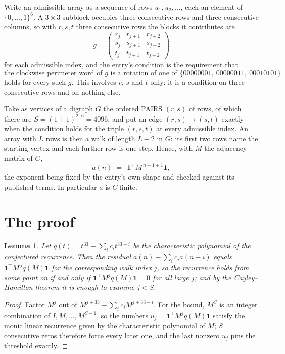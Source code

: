 \documentclass[11pt,a4paper]{article}
\theoremstyle{plain}
\newtheorem{lemma}[theorem]{Lemma}
\theoremstyle{definition}
\begin{document}
Write an admissible array as a sequence of rows $u_1,u_2,\dots$, each an element of
$\{0,\dots,1\}^{6}$. A $3\times3$ subblock occupies three consecutive rows and
three consecutive columns, so with $r,s,t$ three consecutive rows the blocks it
contributes are
\[
g=\begin{pmatrix}r_j&r_{j+1}&r_{j+2}\\ s_j&s_{j+1}&s_{j+2}\\ t_j&t_{j+1}&t_{j+2}\end{pmatrix}
\]
for each admissible index, and the entry's condition is the requirement that
\[
\text{the clockwise perimeter word of }g\text{ is a rotation of one of }\{00000001,\ 00000011,\ 00010101\}
\]
holds for every such $g$. This involves $r$, $s$ and $t$ only: it is a condition on
three consecutive rows and on nothing else.

Take as vertices of a digraph $G$ the ordered PAIRS $(r,s)$ of rows, of which there are
$S=(1+1)^{2\cdot6}=4096$, and put an edge $(r,s)\to(s,t)$ exactly when the condition
holds for the triple $(r,s,t)$ at every admissible index. An array with $L$ rows is then a
walk of length $L-2$ in $G$: its first two rows name the starting vertex and each further
row is one step. Hence, with $M$ the adjacency matrix of $G$,
\[
a(n)\;=\;\,\mathbf{1}^{\!\top}M^{\,n-1+1}\mathbf{1},
\]
the exponent being fixed by the entry's own shape and checked against its published terms.
In particular $a$ is $C$-finite.

\section{The proof}

\begin{lemma}\label{lem:crit}
Let $q(t)=t^{33}-\sum_i c_it^{33-i}$ be the characteristic polynomial of the
conjectured recurrence. Then the residual $a(n)-\sum_ic_ia(n-i)$ equals
$\mathbf{1}^{\!\top}M^{\,j}q(M)\mathbf{1}$ for the corresponding walk index
$j$, so the recurrence holds from some point on if and only if
$\mathbf{1}^{\!\top}M^{j}q(M)\mathbf{1}=0$ for all large $j$; and by the
Cayley--Hamilton theorem it is enough to examine $j<S$.
\end{lemma}

\begin{proof}
Factor $M^{j}$ out of $M^{j+33}-\sum_ic_iM^{j+33-i}$. For the bound, $M^{S}$
is an integer combination of $I,M,\dots,M^{S-1}$, so the numbers
$u_j=\mathbf{1}^{\!\top}M^{j}q(M)\mathbf{1}$ satisfy the monic linear recurrence given by
the characteristic polynomial of $M$; $S$ consecutive zeros therefore force every later one,
and the last nonzero $u_j$ pins the threshold exactly.
\end{proof}
\end{document}
